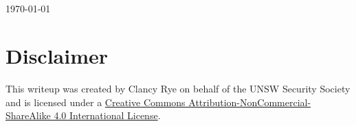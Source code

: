 \documentclass[11pt]{article}
\newenvironment{bottompar}{\par\vspace*{\fill}}{\clearpage} %
\begin{document}
\begin{titlepage}
\begin{bottompar}                %
\begin{minipage}{0.4\textwidth}  %
\begin{flushleft} \large
\end{flushleft}
\end{minipage}
~                                %
\begin{minipage}{0.4\textwidth}
\begin{flushright} \large        %
\end{flushright}
\end{minipage}\\[1cm]            %

{\large \today}                  %
\end{bottompar}
\vfill                           %
\end{titlepage}

\tableofcontents                %
\thispagestyle{empty}           %
\newpage

\section{Disclaimer}
This writeup was created by Clancy Rye on behalf of the UNSW Security Society and is licensed
under a \href{http://creativecommons.org/licenses/by-nc-sa/4.0/}{Creative Commons Attribution-NonCommercial-ShareAlike 4.0 International License}.\\
\end{document}
